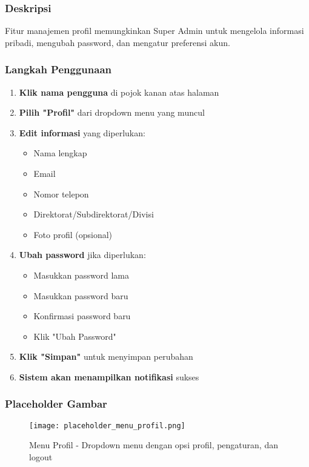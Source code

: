 \documentclass[12pt,a4paper]{article}
\begin{document}
\subsubsection{Deskripsi}
Fitur manajemen profil memungkinkan Super Admin untuk mengelola informasi pribadi, mengubah password, dan mengatur preferensi akun.

\subsubsection{Langkah Penggunaan}
\begin{enumerate}
\item \textbf{Klik nama pengguna} di pojok kanan atas halaman
\item \textbf{Pilih "Profil"} dari dropdown menu yang muncul
\item \textbf{Edit informasi} yang diperlukan:
\begin{itemize}
\item Nama lengkap
\item Email
\item Nomor telepon
\item Direktorat/Subdirektorat/Divisi
\item Foto profil (opsional)
\end{itemize}
\item \textbf{Ubah password} jika diperlukan:
\begin{itemize}
\item Masukkan password lama
\item Masukkan password baru
\item Konfirmasi password baru
\item Klik "Ubah Password"
\end{itemize}
\item \textbf{Klik "Simpan"} untuk menyimpan perubahan
\item \textbf{Sistem akan menampilkan notifikasi} sukses
\end{enumerate}

\subsubsection{Placeholder Gambar}
\begin{figure}[H]
\centering
\texttt{[image: placeholder\_menu\_profil.png]}
\caption{Menu Profil - Dropdown menu dengan opsi profil, pengaturan, dan logout}
\label{fig:menu_profil}
\end{figure}
\end{document}
